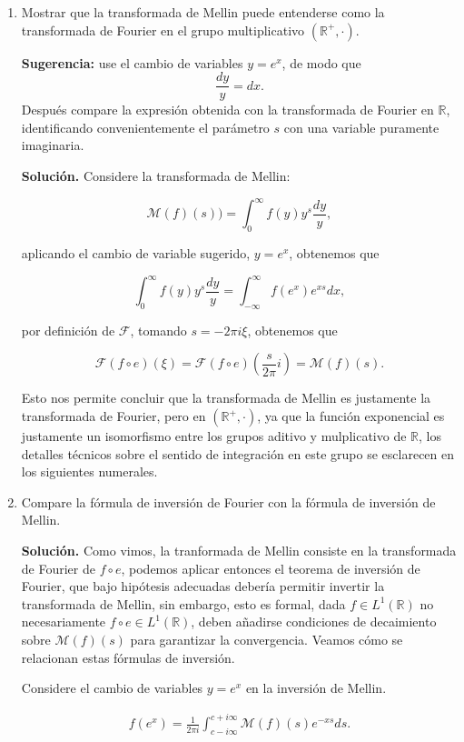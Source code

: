 \documentclass[12pt, a4paper]{article}
\begin{document}
\begin{enumerate}
\item Mostrar que la transformada de Mellin puede entenderse como la transformada de Fourier en el grupo multiplicativo $(\mathbb{R}^+, \cdot)$.

\textbf{Sugerencia:} use el cambio de variables $y = e^x$, de modo que
\[
\frac{dy}{y} = dx.
\]
Después compare la expresión obtenida con la transformada de Fourier en $\mathbb{R}$, identificando convenientemente el parámetro $s$ con una variable puramente imaginaria.

\textbf{Solución.} Considere la transformada de Mellin:

$$\mathcal{M}(f)(s))=\int_0^\infty f(y)y^s\dfrac{dy}{y},$$

aplicando el cambio de variable sugerido, $y=e^x$, obtenemos que 

$$\int_0^\infty f(y)y^s\dfrac{dy}{y}=\int_{-\infty}^{\infty}f(e^x)e^{xs}dx,$$

por definición de $\mathcal{F}$, tomando $s=-2\pi i \xi$, obtenemos que

$$\mathcal{F}(f\circ e )\left(\xi\right)=\mathcal{F}(f\circ e )\left(\frac{s}{2\pi}i\right)=\mathcal{M}(f)(s).$$

Esto nos permite concluir que la transformada de Mellin es justamente la transformada de Fourier, pero en $(\mathbb{R}^+,\cdot)$, ya que la función exponencial es justamente un isomorfismo entre los grupos aditivo y mulplicativo de $\mathbb{R}$, los detalles técnicos sobre el sentido de integración en este grupo se esclarecen en los siguientes numerales.

\item Compare la fórmula de inversión de Fourier con la fórmula de inversión de Mellin.

\textbf{Solución.} Como vimos, la tranformada de Mellin consiste en la transformada de Fourier de $f\circ e$, podemos aplicar entonces el teorema de inversión de Fourier, que bajo hipótesis adecuadas debería permitir invertir la transformada de Mellin, sin embargo, esto es formal, dada $f\in L^1(\mathbb{R})$ no necesariamente $f\circ e \in L^1(\mathbb{R})$, deben añadirse condiciones de decaimiento sobre $\mathcal{M}(f)(s)$ para garantizar la convergencia. Veamos cómo se relacionan estas fórmulas de inversión.

Considere el cambio de variables $y=e^x$ en la inversión de Mellin.

\begin{align*}
f(e^x)=\frac{1}{2\pi i}\int_{c-i\infty}^{c+i\infty}\mathcal{M}(f)(s)e^{-xs}ds  
.\end{align*}


\end{enumerate}
\end{document}
